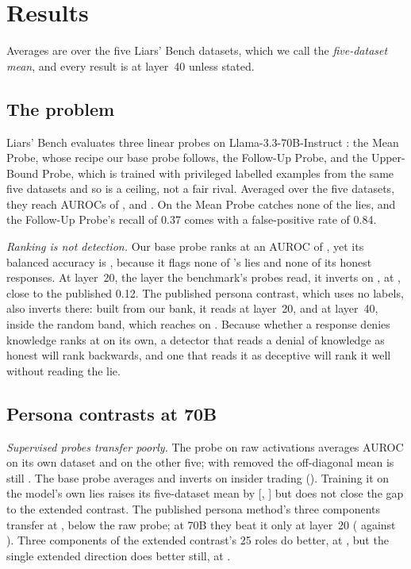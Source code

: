 \section{Results}
\label{sec:results}

Averages are over the five Liars' Bench datasets, which we call the \emph{five-dataset mean}, and every
result is at layer~40 unless stated.

\subsection{The problem}
\label{sec:problem-measured}

Liars' Bench evaluates three linear probes on Llama-3.3-70B-Instruct \cite{kretschmar2025liars}: the
Mean Probe, whose recipe our base probe follows, the Follow-Up Probe, and the Upper-Bound Probe, which
is trained with privileged labelled examples from the same five datasets and so is a ceiling, not a
fair rival. Averaged over the five datasets, they reach AUROCs of ,
 and . On \hpkr{} the Mean Probe catches none of the
lies, and the Follow-Up Probe's recall of 0.37 comes with a false-positive rate of 0.84.

\emph{Ranking is not detection.} Our base probe ranks \hpkr{} at an AUROC of ,
yet its balanced accuracy is , because it flags none of \hpkr's 
lies and none of its honest responses. At layer~20, the layer the benchmark's probes read, it inverts
on \hpkr, at , close to the published 0.12. The published persona contrast, which
uses no labels, also inverts there: built from our bank, it reads  at layer~20, and
 at layer~40, inside the random band, which reaches  on \hpkr.
Because whether a response denies knowledge ranks \hpkr{} at  on its own, a
detector that reads a denial of knowledge as honest will rank \hpkr{} backwards, and one that reads it
as deceptive will rank it well without reading the lie.

\subsection{Persona contrasts at 70B}
\label{sec:zeroshot}

\emph{Supervised probes transfer poorly.} The probe on raw activations averages  AUROC
on its own dataset and  on the other five; with \hpkr{} removed the off-diagonal mean is
still . The base probe averages  and inverts on insider trading
(). Training it on the model's own lies raises its five-dataset mean by
 [, ] but does not close the gap to
the extended contrast. The published persona method's three components transfer at
, below the raw probe; at 70B they beat it only at layer~20 (
against ). Three components of the extended contrast's 25 roles do better, at
, but the single extended direction does better still, at .

